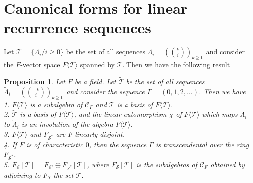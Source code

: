 \documentclass[12pt]{amsart}
\newtheorem{prop}[thrm]{Proposition}
\theoremstyle{definition}
\numberwithin{equation}{section}
\numberwithin{equation}{section}
\begin{document}
\section{Canonical forms for linear recurrence sequences}
\label{sect:Canonical forms}
Let $\mathcal{T}=\{\Lambda_{i}/i\geqslant 0\}$ be the set of all sequences $\Lambda_{i}=(\binom{k}{i})_{k\geq 0}$ and consider the $F$-vector space $F\langle \mathcal{T} \rangle$ spanned by $\mathcal{T}$. Then we have the following result
\begin{prop}\label{Prop 11}
Let $F$ be a field. Let $\widetilde{\mathcal{T}}$ be the set of all sequences $\widetilde{\Lambda}_{i}=(\binom{-k}{i})_{k\geq 0}$ and consider the sequence $\Gamma=(0,1,2,\ldots)$. Then we have
\\1. $F\langle \mathcal{T} \rangle$ is a subalgebra of $\mathcal{C}_{F}$ and $\mathcal{T}$ is a basis of $F\langle \mathcal{T} \rangle$.
\\2. $\widetilde{\mathcal{T}}$ is a basis of $F\langle \mathcal{T} \rangle$, and the linear automorphism $\chi$ of $F\langle \mathcal{T} \rangle$ which maps $\Lambda_{i}$ to $\widetilde{\Lambda}_{i}$ is an involution of the algebra $F\langle \mathcal{T} \rangle$.
\\3. $F\langle \mathcal{T} \rangle$ and $F_{\mathcal{S}^{\ast}}$ are $F$-linearly disjoint.
\\4. If $F$ is of characteristic $0$, then the sequence $\Gamma$ is transcendental over the ring $F_{\mathcal{S}^{\ast}}$.
\\5. $F_{\mathcal{S}}[\mathcal{T}]=F_{\mathcal{S}^{\circ}}\oplus F_{\mathcal{S}^{\ast}}[\mathcal{T}]$, where $F_{\mathcal{S}}[\mathcal{T}]$ is the subalgebras of $\mathcal{C}_{F}$ obtained by adjoining to $F_{\mathcal{S}}$ the set $\mathcal{T}$.
\end{prop}
\end{document}

